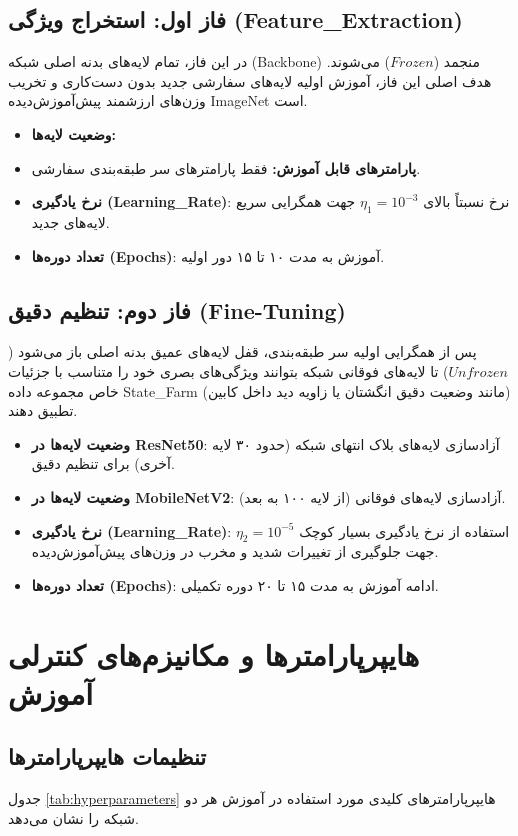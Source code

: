 \documentclass{report}
\begin{document}
 	\subsection{فاز اول: استخراج ویژگی (Feature\_Extraction)}
 	در این فاز، تمام لایه‌های بدنه اصلی شبکه (Backbone) منجمد ($Frozen$) می‌شوند. هدف اصلی این فاز، آموزش اولیه لایه‌های سفارشی جدید بدون دست‌کاری و تخریب وزن‌های ارزشمند پیش‌آموزش‌دیده ImageNet است.
 	\begin{itemize}
 		\item \textbf{وضعیت لایه‌ها:} 
 		\item \textbf{پارامترهای قابل آموزش:} فقط پارامترهای سر طبقه‌بندی سفارشی.
 		\item \textbf{نرخ یادگیری (Learning\_Rate)}: نرخ نسبتاً بالای $\eta_1 = 10^{-3}$ جهت همگرایی سریع لایه‌های جدید.
 		\item \textbf{تعداد دوره‌ها (Epochs)}: آموزش به مدت ۱۰ تا ۱۵ دور اولیه.
 	\end{itemize}
 	
 	\subsection{فاز دوم: تنظیم دقیق (Fine-Tuning)}
 	پس از همگرایی اولیه سر طبقه‌بندی، قفل لایه‌های عمیق بدنه اصلی باز می‌شود ($Unfrozen$) تا لایه‌های فوقانی شبکه بتوانند ویژگی‌های بصری خود را متناسب با جزئیات خاص مجموعه داده State\_Farm (مانند وضعیت دقیق انگشتان یا زاویه دید داخل کابین) تطبیق دهند.
 	\begin{itemize}
 		\item \textbf{وضعیت لایه‌ها در ResNet50}: آزادسازی لایه‌های بلاک انتهای شبکه (حدود ۳۰ لایه آخری) برای تنظیم دقیق.
 		\item \textbf{وضعیت لایه‌ها در MobileNetV2}: آزادسازی لایه‌های فوقانی (از لایه ۱۰۰ به بعد).
 		\item \textbf{نرخ یادگیری (Learning\_Rate)}: استفاده از نرخ یادگیری بسیار کوچک $\eta_2 = 10^{-5}$ جهت جلوگیری از تغییرات شدید و مخرب در وزن‌های پیش‌آموزش‌دیده.
 		\item \textbf{تعداد دوره‌ها (Epochs)}: ادامه آموزش به مدت ۱۵ تا ۲۰ دوره تکمیلی.
 	\end{itemize}
 	
 	\section{هایپرپارامترها و مکانیزم‌های کنترلی آموزش}
 	
 	\subsection{تنظیمات هایپرپارامترها}
 	جدول \ref{tab:hyperparameters} هایپرپارامترهای کلیدی مورد استفاده در آموزش هر دو شبکه را نشان می‌دهد.
 	
\end{document}
